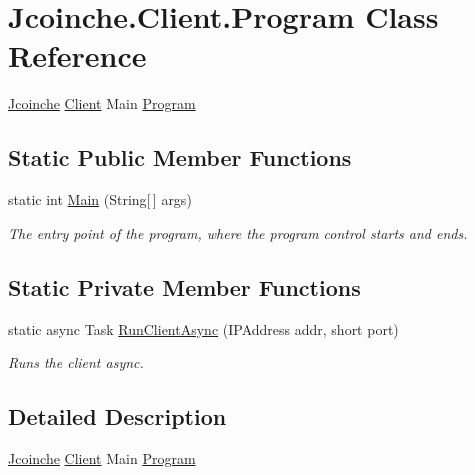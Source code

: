 \hypertarget{class_jcoinche_1_1_client_1_1_program}{}\section{Jcoinche.\+Client.\+Program Class Reference}
\label{class_jcoinche_1_1_client_1_1_program}


\hyperlink{namespace_jcoinche}{Jcoinche} \hyperlink{namespace_jcoinche_1_1_client}{Client} Main \hyperlink{class_jcoinche_1_1_client_1_1_program}{Program}  


\subsection*{Static Public Member Functions}
\begin{DoxyCompactItemize}
\item 
static int \hyperlink{class_jcoinche_1_1_client_1_1_program_a91aff84e93feaac2302e7dd2f37a968d}{Main} (String\mbox{[}$\,$\mbox{]} args)
\begin{DoxyCompactList}\small\item\em The entry point of the program, where the program control starts and ends. \end{DoxyCompactList}\end{DoxyCompactItemize}
\subsection*{Static Private Member Functions}
\begin{DoxyCompactItemize}
\item 
static async Task \hyperlink{class_jcoinche_1_1_client_1_1_program_a0c41b46b8f517f5bc87aa217f7b4cec4}{Run\+Client\+Async} (I\+P\+Address addr, short port)
\begin{DoxyCompactList}\small\item\em Runs the client async. \end{DoxyCompactList}\end{DoxyCompactItemize}


\subsection{Detailed Description}
\hyperlink{namespace_jcoinche}{Jcoinche} \hyperlink{namespace_jcoinche_1_1_client}{Client} Main \hyperlink{class_jcoinche_1_1_client_1_1_program}{Program} 



